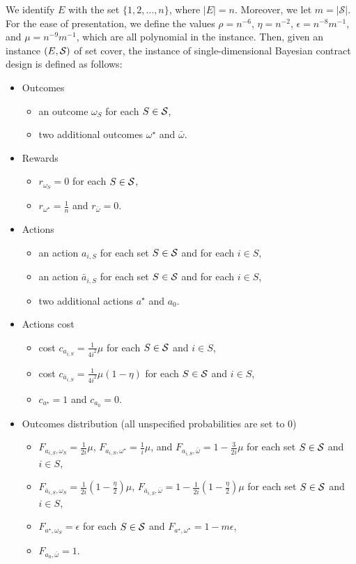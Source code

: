 	We identify $E$ with the set $\{1,2,\ldots, n\}$, where $|E|=n$. 
    Moreover, we let $m=|\mathcal{S}|$.
	For the ease of presentation, we define  the values $\rho=n^{-6}$, $\eta=n^{-2}$, $\epsilon=n^{-8}m^{-1}$, and $\mu=n^{-9}m^{-1}$, which are all polynomial in the instance. 
	Then, given an instance $(E,\mathcal{S})$ of set cover, the instance of single-dimensional Bayesian contract design is defined as follows:
	\begin{itemize}
		\item Outcomes
		\begin{itemize}
			\item an outcome $\omega_{S}$ for each $S \in \mathcal{S}$,
			\item two additional outcomes $\omega^\star$ and $\bar \omega$.
		\end{itemize}
		
		\item Rewards
		\begin{itemize}
			\item $r_{\omega_S}=0$ for each $S \in \mathcal{S}$,
			\item $r_{\omega^\star}=\frac{1}{n}$ and $r_{\bar \omega}=0$.
		\end{itemize}
		
		\item Actions
		\begin{itemize}
			\item an action $a_{i,S}$ for each set $S\in \mathcal{S}$ and for each $i\in S$,
			\item an action $\bar a_{i,S}$ for each set $S\in\mathcal{S}$ and for each $i\in S$, 
			\item two additional actions $a^\star$ and $a_0$.
		\end{itemize}
		
		\item Actions cost
		\begin{itemize}
			\item cost $c_{a_{i, S}}=\frac{1}{4 i^2}\mu $ for each $S\in\mathcal{S}$ and $i\in S$,
			\item cost $c_{\bar a_{i, S}}=\frac{1}{4 i^2}\mu  (1-\eta)$ for each $S\in\mathcal{S}$ and $i\in S$,
			\item $c_{a^\star}=1$ and $c_{a_0}=0$.
		\end{itemize}
		
		\item Outcomes distribution (all unspecified probabilities are set to $0$)
		\begin{itemize}
			\item  $F_{a_{i,S},\omega_S}=\frac{1}{2i}\mu$,  $F_{a_{i,S}, \omega^\star}=\frac{1}{i}\mu$, and $F_{a_{i,S},\bar \omega}=1-\frac{3}{2i}\mu$ for each set $S\in \mathcal{S}$ and $i\in S$,
		\item $F_{\bar a_{i,S},\omega_S}=\frac{1}{2i}(1-\frac\eta2)\mu$, $F_{\bar a_{i,S},\bar \omega}=1-\frac{1}{2i}(1-\frac\eta2)\mu$ for each set $S\in\mathcal{S}$ and $i\in S$,
			\item $F_{a^\star,\omega_S}=\epsilon$ for each $S\in\mathcal{S}$ and $F_{a^\star,\omega^\star}=1-m\epsilon$,
			\item $F_{a_0, \bar\omega}=1$.
		\end{itemize}
		

\end{itemize}
